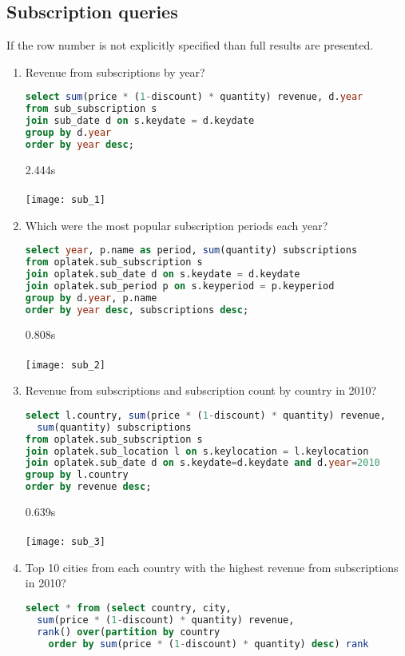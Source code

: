 \subsection*{Subscription queries} %
\label{sub:Subscription business queries}
If the row number is not explicitly specified than full results are presented.
\begin{enumerate}
  \item Revenue from subscriptions by year?
\begin{lstlisting}[language=sql]
select sum(price * (1-discount) * quantity) revenue, d.year 
from sub_subscription s 
join sub_date d on s.keydate = d.keydate 
group by d.year 
order by year desc;
\end{lstlisting}
    2.444s \\ \\
      \texttt{[image: sub\_1]}
  \item Which were the most popular subscription periods each year?
\begin{lstlisting}[language=sql]
select year, p.name as period, sum(quantity) subscriptions
from oplatek.sub_subscription s 
join oplatek.sub_date d on s.keydate = d.keydate
join oplatek.sub_period p on s.keyperiod = p.keyperiod 
group by d.year, p.name
order by year desc, subscriptions desc;
\end{lstlisting}
    0.808s \\ \\
      \texttt{[image: sub\_2]}
  \item Revenue from subscriptions and subscription count by country in 2010?
\begin{lstlisting}[language=sql]
select l.country, sum(price * (1-discount) * quantity) revenue, 
  sum(quantity) subscriptions 
from oplatek.sub_subscription s 
join oplatek.sub_location l on s.keylocation = l.keylocation 
join oplatek.sub_date d on s.keydate=d.keydate and d.year=2010
group by l.country 
order by revenue desc;
\end{lstlisting}
     0.639s \\ \\
      \texttt{[image: sub\_3]}
  \item Top 10 cities from each country with the highest revenue from subscriptions in 2010?
\begin{lstlisting}[language=sql]  
select * from (select country, city, 
  sum(price * (1-discount) * quantity) revenue, 
  rank() over(partition by country 
    order by sum(price * (1-discount) * quantity) desc) rank 

\end{lstlisting}
\end{enumerate}

